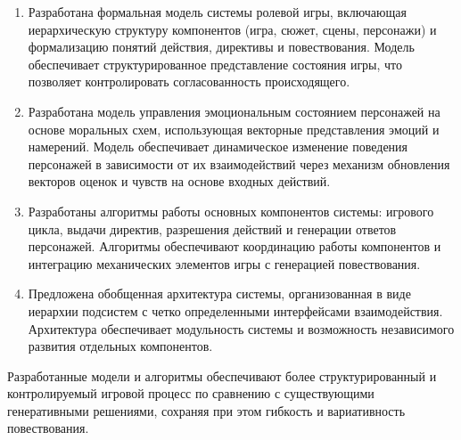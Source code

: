 \begin{enumerate}
	\item Разработана формальная модель системы ролевой игры, включающая иерархическую структуру компонентов (игра, сюжет, сцены, персонажи) и формализацию понятий действия, директивы и повествования. Модель обеспечивает структурированное представление состояния игры, что позволяет контролировать согласованность происходящего.
	
	\item Разработана модель управления эмоциональным состоянием персонажей на основе моральных схем, использующая векторные представления эмоций и намерений. Модель обеспечивает динамическое изменение поведения персонажей в зависимости от их взаимодействий через механизм обновления векторов оценок и чувств на основе входных действий.
	
	\item Разработаны алгоритмы работы основных компонентов системы: игрового цикла, выдачи директив, разрешения действий и генерации ответов персонажей. Алгоритмы обеспечивают координацию работы компонентов и интеграцию механических элементов игры с генерацией повествования.
	
	\item Предложена обобщенная архитектура системы, организованная в виде иерархии подсистем с четко определенными интерфейсами взаимодействия. Архитектура обеспечивает модульность системы и возможность независимого развития отдельных компонентов.
\end{enumerate}

Разработанные модели и алгоритмы обеспечивают более структурированный и контролируемый игровой процесс по сравнению с существующими генеративными решениями, сохраняя при этом гибкость и вариативность повествования.

